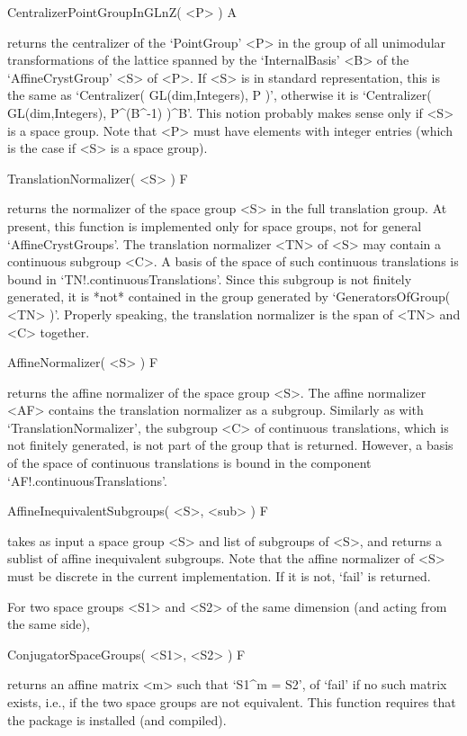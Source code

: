 \>CentralizerPointGroupInGLnZ( <P> ) A

returns the centralizer of the `PointGroup' <P> in the group of 
all unimodular transformations of the lattice spanned by the
`InternalBasis' <B> of the `AffineCrystGroup' <S> of <P>. 
If <S> is in standard representation, this is the same as 
`Centralizer( GL(dim,Integers), P )', otherwise it is
`Centralizer( GL(dim,Integers), P^(B^-1) )^B'. This notion
probably makes sense only if <S> is a space group. Note that 
<P> must have elements with integer entries (which is the case 
if <S> is a space group).

\>TranslationNormalizer( <S> ) F

returns the normalizer of the space group <S> in the full translation
group. At present, this function is implemented only for space groups,
not for general `AffineCrystGroups'.  The translation normalizer <TN>
of <S> may contain a continuous subgroup <C>.  A basis of the space of
such continuous translations is bound in `TN!.continuousTranslations'.
Since this subgroup is not finitely generated, it is *not* contained
in the group generated by `GeneratorsOfGroup( <TN> )'. Properly speaking, 
the translation normalizer is the span of <TN> and <C> together.

\>AffineNormalizer( <S> ) F

returns the affine normalizer of the space group <S>.  The affine
normalizer <AF> contains the translation normalizer as a subgroup.
Similarly as with `TranslationNormalizer', the subgroup <C> of
continuous translations, which is not finitely generated, is not part
of the group that is returned.  However, a basis of the space of
continuous translations is bound in the component 
`AF!.continuousTranslations'.

\>AffineInequivalentSubgroups( <S>, <sub> ) F

takes as input a space group <S> and list of subgroups of <S>,
and returns a sublist of affine inequivalent subgroups.
Note that the affine normalizer of <S> must be discrete in the
current implementation. If it is not, `fail' is returned. 

For two space groups <S1> and <S2> of the same dimension (and
acting from the same side), 

\>ConjugatorSpaceGroups( <S1>, <S2> ) F

returns an affine matrix <m> such that `S1\^{}m = S2', of `fail'
if no such matrix exists, i.e., if the two space groups are not
equivalent. This function requires that the {\GAP} package {\CARAT} is
installed (and compiled).

